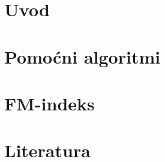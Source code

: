 \documentclass[pdftex,12pt,a4paper]{report}
\begin{document}


\tableofcontents

\chapter{Uvod}


\chapter{Pomoćni algoritmi}


\chapter{FM-indeks}



\chapter{Literatura}
%
%
%
 
\end{document}

